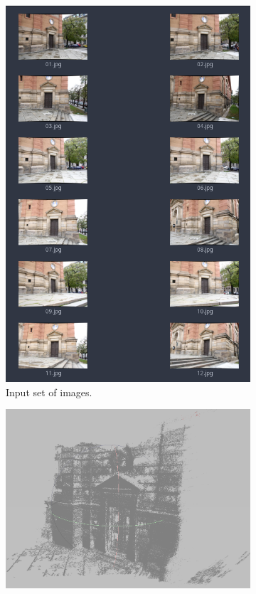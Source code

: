 \begin{figure}[h]
    \begin{subfigure}[b]{0.31\textwidth}
      \includegraphics[width=\textwidth]{graphics/input_set.png}
      \caption{Input set of images.}
      \label{fig:chb1}
    \end{subfigure}
    \hfill
    \begin{subfigure}[b]{0.65\textwidth}
      \includegraphics[width=\textwidth]{graphics/reconstructed.png}

\end{subfigure}
\end{figure}
